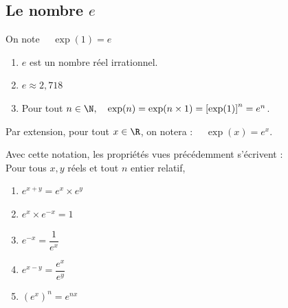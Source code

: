 \documentclass[a4paper,11pt,cours]{nsi} %
\begin{document}

\subsection*{Le nombre $e$}
\begin{definition}[ ]
	On note $\quad \exp(1)=e$
\end{definition}

\begin{remarque}[s]
	\begin{enumerate}[label=\textbullet]
		\item 	$e$ est un nombre réel irrationnel.
		\item 	$e \approx 2,718$
		\item	Pour tout $n\in\N, \quad \exp(n)=\exp(n\times 1)=\left[\exp(1)\right]^n=e^n$.	
	\end{enumerate}
\end{remarque}
	
\begin{notation}[ ]
	Par extension, pour tout $x\in \R$, on notera : $\quad \exp(x)=e^x$.
\end{notation}

\setlength{\columnseprule}{0pt}
\setlength{\columnsep}{0.5cm}

\begin{propriete}[]
	Avec cette notation, les propriétés vues précédemment s'écrivent :\\
	Pour tous $x, y$ réels et tout $n$ entier relatif,
	\begin{multicols}{5}
		\begin{enumerate}[label=\textbullet]
			\item 	$e^{x+y}=e^x\times e^y$
			\item 	$e^x\times e^{-x}=1$
			\item	$e^{-x}=\dfrac{1}{e^x}$
			\item	$e^{x-y}=\dfrac{e^x}{e^y}$
			\item	$\left(e^x\right)^n=e^{nx}$
		\end{enumerate}
	\end{multicols} 
\end{propriete}
\end{document}
